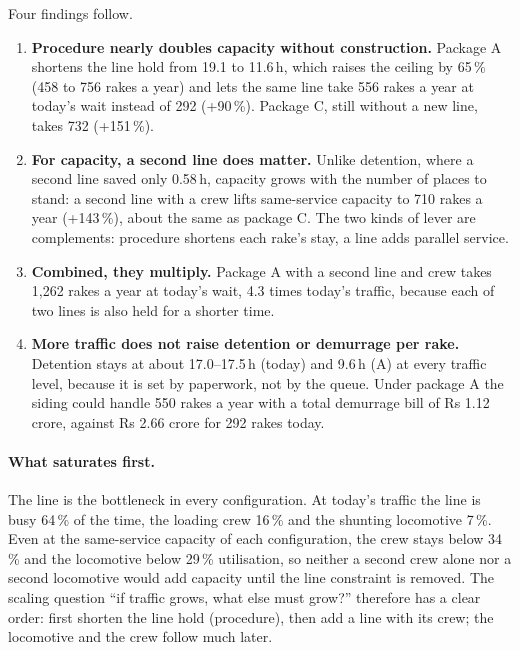 Four findings follow.
\begin{enumerate}
    \item \textbf{Procedure nearly doubles capacity without construction.} Package A shortens the line hold from 19.1 to 11.6\,h, which raises the ceiling by 65\,\% (458 to 756 rakes a year) and lets the same line take 556 rakes a year at today's wait instead of 292 (+90\,\%). Package C, still without a new line, takes 732 (+151\,\%).
    \item \textbf{For capacity, a second line does matter.} Unlike detention, where a second line saved only 0.58\,h, capacity grows with the number of places to stand: a second line with a crew lifts same-service capacity to 710 rakes a year (+143\,\%), about the same as package C. The two kinds of lever are complements: procedure shortens each rake's stay, a line adds parallel service.
    \item \textbf{Combined, they multiply.} Package A with a second line and crew takes 1,262 rakes a year at today's wait, 4.3 times today's traffic, because each of two lines is also held for a shorter time.
    \item \textbf{More traffic does not raise detention or demurrage per rake.} Detention stays at about 17.0--17.5\,h (today) and 9.6\,h (A) at every traffic level, because it is set by paperwork, not by the queue. Under package A the siding could handle 550 rakes a year with a total demurrage bill of Rs 1.12 crore, against Rs 2.66 crore for 292 rakes today.
\end{enumerate}

\paragraph{What saturates first.} The line is the bottleneck in every configuration. At today's traffic the line is busy 64\,\% of the time, the loading crew 16\,\% and the shunting locomotive 7\,\%. Even at the same-service capacity of each configuration, the crew stays below 34\,\% and the locomotive below 29\,\% utilisation, so neither a second crew alone nor a second locomotive would add capacity until the line constraint is removed. The scaling question ``if traffic grows, what else must grow?'' therefore has a clear order: first shorten the line hold (procedure), then add a line with its crew; the locomotive and the crew follow much later.

